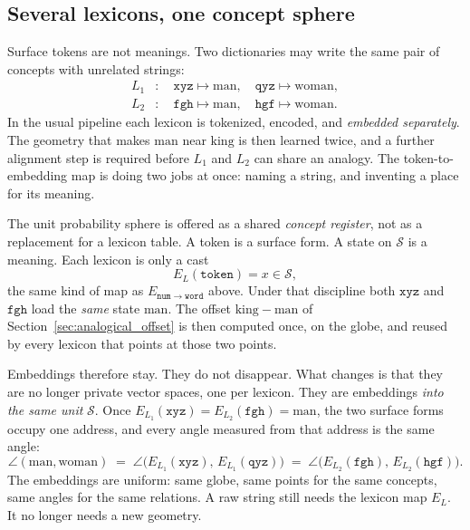 \documentclass[12pt, a4paper]{article}
\begin{document}
\subsection{Several lexicons, one concept sphere}
\label{subsec:shared_lexicons}
Surface tokens are not meanings. Two dictionaries may write the same
pair of concepts with unrelated strings:
\begin{equation}
    \begin{aligned}
        L_1&: \quad \texttt{xyz}\mapsto\mathrm{man},\quad
                    \texttt{qyz}\mapsto\mathrm{woman},\\
        L_2&: \quad \texttt{fgh}\mapsto\mathrm{man},\quad
                    \texttt{hgf}\mapsto\mathrm{woman}.
    \end{aligned}
    \label{eq:two_lexicons}
\end{equation}
In the usual pipeline each lexicon is tokenized, encoded, and
\emph{embedded separately}. The geometry that makes
$\mathrm{man}$ near $\mathrm{king}$ is then learned twice, and a
further alignment step is required before $L_1$ and $L_2$ can share
an analogy. The token-to-embedding map is doing two jobs at once:
naming a string, and inventing a place for its meaning.

The unit probability sphere is offered as a shared
\emph{concept register}, not as a replacement for a lexicon table.
A token is a surface form. A state on $\mathcal{S}$ is a meaning.
Each lexicon is only a cast
\begin{equation}
    E_{L}(\texttt{token}) = x\in\mathcal{S},
    \label{eq:lexicon_cast}
\end{equation}
the same kind of map as $E_{\mathtt{num}\to\mathtt{word}}$ above.
Under that discipline both $\texttt{xyz}$ and $\texttt{fgh}$ load the
\emph{same} state $\mathrm{man}$. The offset
$\mathrm{king}-\mathrm{man}$ of Section~\ref{sec:analogical_offset}
is then computed once, on the globe, and reused by every lexicon that
points at those two points.

Embeddings therefore stay. They do not disappear.
What changes is that they are no longer private vector spaces, one
per lexicon. They are embeddings \emph{into the same unit}
$\mathcal{S}$. Once $E_{L_1}(\texttt{xyz})=E_{L_2}(\texttt{fgh})=\mathrm{man}$,
the two surface forms occupy one address, and every angle measured
from that address is the same angle:
\begin{equation}
    \angle(\mathrm{man},\mathrm{woman})
    \;=\;
    \angle\bigl(E_{L_1}(\texttt{xyz}),\,E_{L_1}(\texttt{qyz})\bigr)
    \;=\;
    \angle\bigl(E_{L_2}(\texttt{fgh}),\,E_{L_2}(\texttt{hgf})\bigr).
    \label{eq:uniform_angles}
\end{equation}
The embeddings are uniform: same globe, same points for the same
concepts, same angles for the same relations. A raw string still
needs the lexicon map $E_L$. It no longer needs a new geometry.
\end{document}
